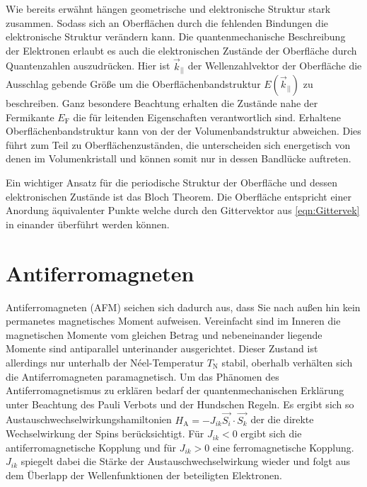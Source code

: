         Wie bereits erwähnt hängen geometrische und elektronische Struktur stark zusammen.
        Sodass sich an Oberflächen durch die fehlenden Bindungen die elektronische Struktur verändern kann.
        Die quantenmechanische Beschreibung der Elektronen erlaubt es auch die elektronischen Zustände der Oberfläche durch Quantenzahlen auszudrücken.
        Hier ist $\vec{k}_{||}$ der Wellenzahlvektor der Oberfläche die Ausschlag gebende Größe um die Oberflächenbandstruktur $E(\vec{k}_{||})$ zu beschreiben.
        Ganz besondere Beachtung erhalten die Zustände nahe der Fermikante $E_\text{F}$ die für leitenden Eigenschaften verantwortlich sind.
        Erhaltene Oberflächenbandstruktur kann von der der Volumenbandstruktur abweichen.
        Dies führt zum Teil zu Oberflächenzuständen, die unterscheiden sich energetisch von denen im Volumenkristall und können somit nur in dessen Bandlücke auftreten.

        Ein wichtiger Ansatz für die periodische Struktur der Oberfläche und dessen elektronischen Zustände ist das Bloch Theorem.
        Die Oberfläche entspricht einer Anordung äquivalenter Punkte welche durch den Gittervektor aus \autoref{eqn:Gittervek} in einander überführt werden können.

        


    \section{Antiferromagneten}
        Antiferromagneten (AFM) seichen sich dadurch aus, dass Sie nach außen hin kein permanetes magnetisches Moment aufweisen.
        Vereinfacht sind im Inneren die magnetischen Momente vom gleichen Betrag und nebeneinander liegende Momente sind antiparallel unterinander ausgerichtet.
        Dieser Zustand ist allerdings nur unterhalb der Néel-Temperatur $T_\text{N}$ stabil, oberhalb verhälten sich die Antiferromagneten paramagnetisch.
        Um das Phänomen des Antiferromagnetismus zu erklären bedarf der quantenmechanischen Erklärung unter Beachtung des Pauli Verbots und der Hundschen Regeln.
        Es ergibt sich so Austauschwechselwirkungshamiltonien $H_\text{A} = - J_{ik} \vec{S_i}\cdot\vec{S_k}$ der die direkte Wechselwirkung der Spins berücksichtigt.
        Für $J_{ik} < 0$ ergibt sich die antiferromagnetische Kopplung und für $J_{ik} > 0$ eine ferromagnetische Kopplung.
        $J_{ik}$ spiegelt dabei die Stärke der Austauschwechselwirkung wieder und folgt aus dem Überlapp der Wellenfunktionen der beteiligten Elektronen.


